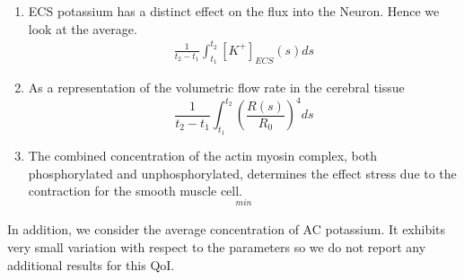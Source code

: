 \documentclass[12pt]{article}
\numberwithin{equation}{section}
\begin{document}
\begin{enumerate}
\item ECS potassium has a distinct effect on the flux into the Neuron. Hence we look at the average.
\begin{eqnarray}
 \frac{1}{t_2-t_1}\int_{t_1}^{t_2}[K^+]_{ECS}(s)ds \label{K_ECS_Mean}
\end{eqnarray}

\item As a representation of the volumetric flow rate in the cerebral tissue
\begin{equation}
\frac{1}{t_2-t_1}\int_{t_1}^{t_2}\left(\frac{R(s)}{R_0}\right)^4ds \label{vol_flow}
\end{equation}
 
\item The combined concentration of the actin myosin complex, both phosphorylated and unphosphorylated, determines the effect stress due to the contraction for the smooth muscle cell. 
\begin{eqnarray}
[AM+AM_p]_{min} \label{AM_AMp_Min}
\end{eqnarray}

\end{enumerate}

In addition, we consider the average concentration of AC potassium. It exhibits very small variation with respect to the parameters so we do not report any additional results for this QoI.
\end{document}
